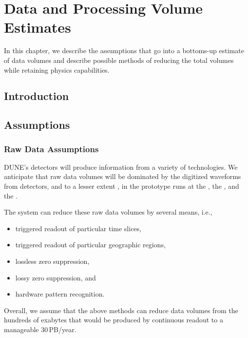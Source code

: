 \documentclass[../main-v1.tex]{subfiles}
\begin{document}
\chapter{Data and Processing Volume Estimates }
\label{ch:est}
 
In this chapter, we describe the assumptions that go into a bottoms-up estimate of data volumes and describe possible methods of reducing the total volumes while retaining physics capabilities. 


\section{Introduction }


\section{Assumptions }
\label{sec:est:assume}  %

\subsection{Raw Data Assumptions }
DUNE's detectors will produce information from a variety of technologies.  We anticipate that raw data volumes will be dominated by the digitized waveforms from  detectors, and to a lesser extent , in the prototype runs at the , the , and the .  

The  system can reduce these raw data volumes by several means, i.e.,
\begin{itemize} 
\item triggered readout of particular time slices,
\item triggered readout of particular geographic regions,
\item lossless zero suppression,
\item lossy zero suppression, and
\item hardware pattern recognition.
\end{itemize}

Overall, we assume that the above methods can reduce data volumes from the hundreds of exabytes that would be produced by continuous readout to a manageable 30\,PB/year. 
\end{document}
